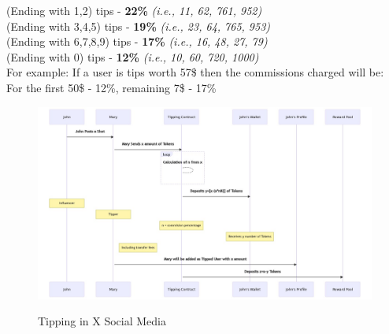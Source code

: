 \documentclass[letterpaper,11pt]{article}
\begin{document}
(Ending with 1,2) tips     - \textbf{22\%}   \textit{ (i.e., 11, 62, 761, 952)}\\
(Ending with 3,4,5) tips   - \textbf{19\%}   \textit{ (i.e., 23, 64, 765, 953)}\\
(Ending with 6,7,8,9) tips - \textbf{17\%}   \textit{(i.e., 16, 48, 27,  79)}\\
(Ending with 0) tips       - \textbf{12\%}   \textit{(i.e., 10, 60, 720, 1000)}\\


For example: If a user is tips worth 57\$ then the commissions charged will be: For the first     50\$ - 12\%, remaining 7\$  - 17\%\\

\begin{figure}
\includegraphics[width=\textwidth]{tips}\\
\caption{Tipping in X Social Media}
\end{figure}

\end{document}
